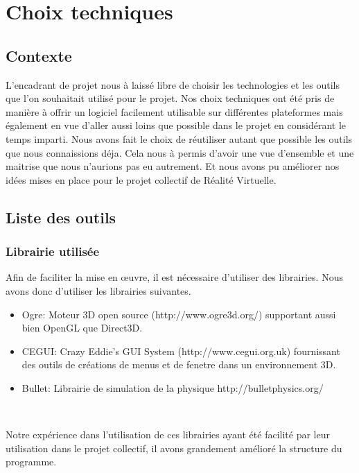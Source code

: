 \documentclass[frenchb,twoside]{EPURapport}
\begin{document}
   
    
    
\chapter{Choix techniques}
    \section{Contexte}
    L'encadrant de projet nous à laissé libre de choisir les technologies et
    les outils que l'on souhaitait utilisé pour le projet. Nos choix techniques
    ont été pris de manière à offrir un logiciel facilement utilisable sur
    différentes plateformes mais également en vue d'aller aussi loins que
    possible dans le projet en considérant le temps imparti. Nous avons fait le
    choix de réutiliser autant que possible les outils que nous connaissions
    déja. Cela nous à permis d'avoir une vue d'ensemble et une maitrise que
    nous n'aurions pas eu autrement. Et nous avons pu améliorer nos
    idées mises en place pour le projet collectif de Réalité Virtuelle.
    
    

    \section{Liste des outils}
		\subsection{Librairie utilisée}
		
		Afin de faciliter la mise en \oe{}uvre, il est nécessaire d'utiliser des librairies.
		Nous avons donc d'utiliser les librairies suivantes.
		\begin{itemize}
			\item Ogre: Moteur 3D open source
			(http://www.ogre3d.org/) supportant aussi bien OpenGL que Direct3D. 
			\item CEGUI: Crazy Eddie's GUI System
			(http://www.cegui.org.uk) fournissant des outils de créations de menus
			et de fenetre dans un environnement 3D.
			\item Bullet: Librairie de simulation de
			la physique http://bulletphysics.org/
		\end{itemize}
		
		\
		
		Notre expérience dans l'utilisation de ces librairies ayant été facilité
		par leur utilisation dans le projet collectif, il
		avons grandement amélioré la structure du programme.
		
\end{document}
